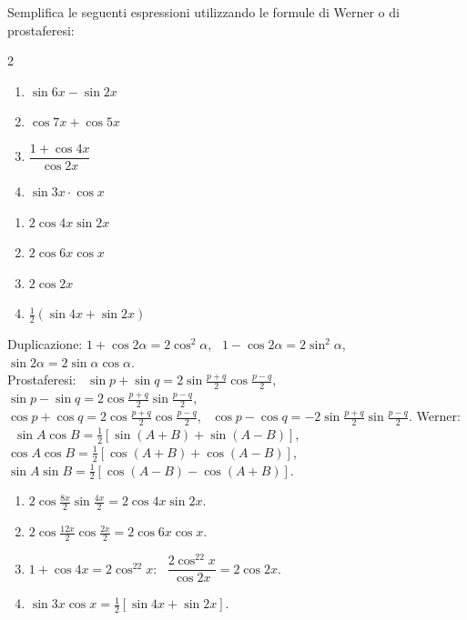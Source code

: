 
\begin{question}[ID=3.3, subtitle={Formule di Werner e prostaferesi — serie 3}, tags={goniometria, prostaferesi, Werner}, difficulty=media]
Semplifica le seguenti espressioni utilizzando le formule di Werner o di prostaferesi:
\begin{multicols}{2}
\begin{enumerate}
\item $\sin 6x - \sin 2x$
\item $\cos 7x + \cos 5x$
\item $\dfrac{1 + \cos 4x}{\cos 2x}$
\item $\sin 3x \cdot \cos x$
\end{enumerate}
\end{multicols}
\begin{solution}
\begin{enumerate}
    \item $2\cos4x\sin2x$
    \item $2\cos6x\cos x$
    \item $2\cos2x$
    \item $\tfrac12(\sin4x+\sin2x)$
\end{enumerate}
\end{solution}
\begin{explanation}
Duplicazione: $1+\cos2\alpha=2\cos^2\alpha$, \ $1-\cos2\alpha=2\sin^2\alpha$, \ $\sin2\alpha=2\sin\alpha\cos\alpha$. \\
Prostaferesi: \ $\sin p+\sin q=2\sin\tfrac{p+q}{2}\cos\tfrac{p-q}{2}$, \ $\sin p-\sin q=2\cos\tfrac{p+q}{2}\sin\tfrac{p-q}{2}$, \\
$\cos p+\cos q=2\cos\tfrac{p+q}{2}\cos\tfrac{p-q}{2}$, \ $\cos p-\cos q=-2\sin\tfrac{p+q}{2}\sin\tfrac{p-q}{2}$.
Werner: \ $\sin A\cos B=\tfrac12[\sin(A+B)+\sin(A-B)]$, \ $\cos A\cos B=\tfrac12[\cos(A+B)+\cos(A-B)]$, \ $\sin A\sin B=\tfrac12[\cos(A-B)-\cos(A+B)]$.
\begin{enumerate}
    \item $2\cos\tfrac{8x}{2}\sin\tfrac{4x}{2}=2\cos4x\sin2x$.
    \item $2\cos\tfrac{12x}{2}\cos\tfrac{2x}{2}=2\cos6x\cos x$.
    \item $1+\cos4x=2\cos^22x$: \ $\dfrac{2\cos^22x}{\cos2x}=2\cos2x$.
    \item $\sin3x\cos x=\tfrac12\left[\sin4x+\sin2x\right]$.
\end{enumerate}
\end{explanation}
\end{question}

